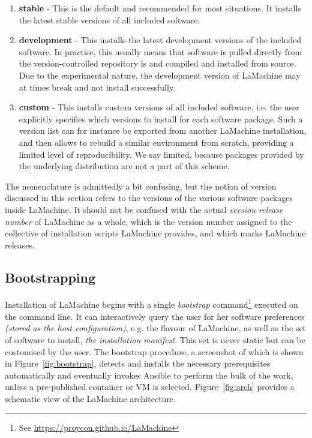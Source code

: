 \documentclass[a4paper,11pt]{article}
\begin{document}
\begin{enumerate}
    \item \textbf{stable} - This is the default and recommended for most situations. It installs the latest stable
        versions of all included software.
    \item \textbf{development} - This installs the latest development versions of the included software. In practise,
        this usually means that software is pulled directly from the version-controlled repository is and compiled and installed from source. Due to the experimental nature, the development version of
        LaMachine may at times break and not install successfully.
    \item \textbf{custom} - This installs custom versions of all included software, i.e. the user explicitly
        specifies which versions to install for each software package.  Such a version list can for instance be exported
        from another LaMachine installation, and then allows to rebuild a similar environment from scratch, providing a
        limited level of reproducibility. We say limited, because packages
        provided by the underlying distribution are not a part of this scheme.
\end{enumerate}

The nomenclature is admittedly a bit confusing, but the notion of version discussed in this section refers to the
versions of the various software packages inside LaMachine. It should not be
confused with the actual \emph{version release number} of LaMachine as a whole, which is the version number assigned to
the collective of installation scripts LaMachine provides, and which marks LaMachine releases.

\subsection{Bootstrapping}

Installation of LaMachine begins with a single \emph{bootstrap} command\footnote{See \url{https://proycon.github.io/LaMachine}}
executed on the command line.  It can interactively query the user for her software preferences \emph{(stored as the
host configuration)}, e.g. the flavour of LaMachine, as well as the set of software to install, \emph{the installation
manifest}. This set is never static but can be customised by the user. The bootstrap procedure, a screenshot of which is shown in
Figure~\ref{fig:bootstrap}, detects and installs the
necessary prerequisites automatically and eventually invokes Ansible to perform the bulk of the work, unless a
pre-published container or VM is selected.  Figure~\ref{fig:arch} provides a schematic view of the LaMachine
architecture.
\end{document}
